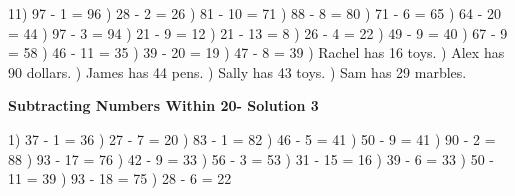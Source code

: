 \documentclass{article}%
\begin{document}
11) 97 {-} 1 = 96%
) 28 {-} 2 = 26%
) 81 {-} 10 = 71%
) 88 {-} 8 = 80%
) 71 {-} 6 = 65%
) 64 {-} 20 = 44%
) 97 {-} 3 = 94%
) 21 {-} 9 = 12%
) 21 {-} 13 = 8%
) 26 {-} 4 = 22%
) 49 {-} 9 = 40%
) 67 {-} 9 = 58%
) 46 {-} 11 = 35%
) 39 {-} 20 = 19%
) 47 {-} 8 = 39%
) Rachel has 16 toys.%
) Alex has 90 dollars.%
) James has 44 pens.%
) Sally has 43 toys.%
) Sam has 29 marbles.%
\newline%
\newpage%
\large%
\begin{center}%
\textbf{Subtracting Numbers Within 20- Solution 3}%
\newline%
\end{center} \normalsize%
1) 37 {-} 1 = 36%
) 27 {-} 7 = 20%
) 83 {-} 1 = 82%
) 46 {-} 5 = 41%
) 50 {-} 9 = 41%
) 90 {-} 2 = 88%
) 93 {-} 17 = 76%
) 42 {-} 9 = 33%
) 56 {-} 3 = 53%
) 31 {-} 15 = 16%
) 39 {-} 6 = 33%
) 50 {-} 11 = 39%
) 93 {-} 18 = 75%
) 28 {-} 6 = 22%
\newline%
\end{document}

